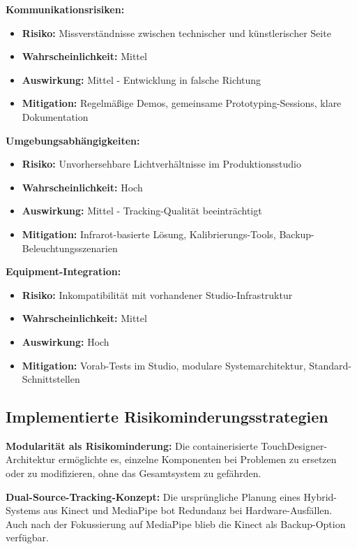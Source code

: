 \textbf{Kommunikationsrisiken:}
\begin{itemize}
    \item \textbf{Risiko:} Missverständnisse zwischen technischer und künstlerischer Seite
    \item \textbf{Wahrscheinlichkeit:} Mittel
    \item \textbf{Auswirkung:} Mittel - Entwicklung in falsche Richtung
    \item \textbf{Mitigation:} Regelmäßige Demos, gemeinsame Prototyping-Sessions, klare Dokumentation
\end{itemize}

\textbf{Umgebungsabhängigkeiten:}
\begin{itemize}
    \item \textbf{Risiko:} Unvorhersehbare Lichtverhältnisse im Produktionsstudio
    \item \textbf{Wahrscheinlichkeit:} Hoch
    \item \textbf{Auswirkung:} Mittel - Tracking-Qualität beeinträchtigt
    \item \textbf{Mitigation:} Infrarot-basierte Lösung, Kalibrierungs-Tools, Backup-Beleuchtungsszenarien
\end{itemize}

\textbf{Equipment-Integration:}
\begin{itemize}
    \item \textbf{Risiko:} Inkompatibilität mit vorhandener Studio-Infrastruktur
    \item \textbf{Wahrscheinlichkeit:} Mittel
    \item \textbf{Auswirkung:} Hoch
    \item \textbf{Mitigation:} Vorab-Tests im Studio, modulare Systemarchitektur, Standard-Schnittstellen
\end{itemize}

\subsection{Implementierte Risikominderungsstrategien}

\textbf{Modularität als Risikominderung:}
Die containerisierte TouchDesigner-Architektur ermöglichte es, einzelne Komponenten bei Problemen zu ersetzen oder zu modifizieren, ohne das Gesamtsystem zu gefährden.

\textbf{Dual-Source-Tracking-Konzept:}
Die ursprüngliche Planung eines Hybrid-Systems aus Kinect und MediaPipe bot Redundanz bei Hardware-Ausfällen. Auch nach der Fokussierung auf MediaPipe blieb die Kinect als Backup-Option verfügbar.

